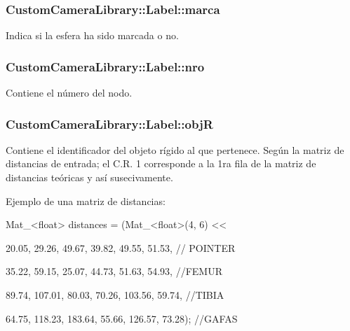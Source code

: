 \subsubsection[{\texorpdfstring{marca}{marca}}]{\setlength{\rightskip}{0pt plus 5cm}Custom\+Camera\+Library\+::\+Label\+::marca}\hypertarget{struct_custom_camera_library_1_1_label_aee7618e63b0af9f8471c6c666ccb033f}{}\label{struct_custom_camera_library_1_1_label_aee7618e63b0af9f8471c6c666ccb033f}
Indica si la esfera ha sido marcada o no. 
\subsubsection[{\texorpdfstring{nro}{nro}}]{\setlength{\rightskip}{0pt plus 5cm}Custom\+Camera\+Library\+::\+Label\+::nro}\hypertarget{struct_custom_camera_library_1_1_label_ab47ae69658cf38cb404be369acd6b004}{}\label{struct_custom_camera_library_1_1_label_ab47ae69658cf38cb404be369acd6b004}
Contiene el número del nodo. 
\subsubsection[{\texorpdfstring{objR}{objR}}]{\setlength{\rightskip}{0pt plus 5cm}Custom\+Camera\+Library\+::\+Label\+::objR}\hypertarget{struct_custom_camera_library_1_1_label_a6975017853bad717d96e213e22cc0e18}{}\label{struct_custom_camera_library_1_1_label_a6975017853bad717d96e213e22cc0e18}
Contiene el identificador del objeto rígido al que pertenece. Según la matriz de distancias de entrada; el C.\+R. 1 corresponde a la 1ra fila de la matriz de distancias teóricas y así susecivamente.

Ejemplo de una matriz de distancias\+: \begin{DoxyVerb} Mat_<float> distances = (Mat_<float>(4, 6) <<

     20.05, 29.26, 49.67, 39.82, 49.55, 51.53,     // POINTER

     35.22, 59.15, 25.07, 44.73, 51.63, 54.93,     //FEMUR

     89.74, 107.01, 80.03, 70.26, 103.56, 59.74,   //TIBIA

     64.75, 118.23, 183.64, 55.66, 126.57, 73.28); //GAFAS
\end{DoxyVerb}


